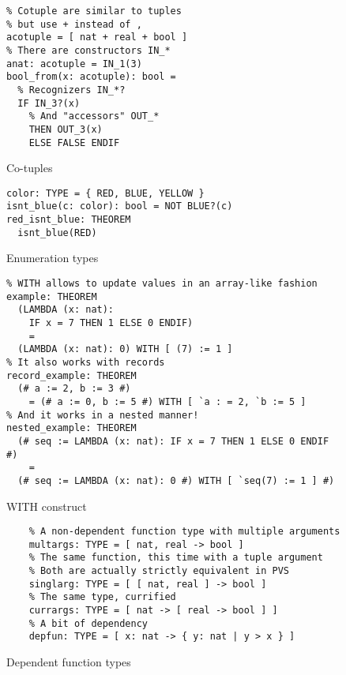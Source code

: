 \documentclass[utf8,a4paper]{article}
\begin{document}
\begin{figure}
  \centering
  \begin{verbatim}
% Cotuple are similar to tuples
% but use + instead of ,
acotuple = [ nat + real + bool ]
% There are constructors IN_*
anat: acotuple = IN_1(3)
bool_from(x: acotuple): bool =
  % Recognizers IN_*?
  IF IN_3?(x)
    % And "accessors" OUT_*
    THEN OUT_3(x)
    ELSE FALSE ENDIF
  \end{verbatim}
  \caption{Co-tuples}
  \label{fig:cotuple}
\end{figure}

\begin{figure}
  \centering
  \begin{verbatim}
color: TYPE = { RED, BLUE, YELLOW }
isnt_blue(c: color): bool = NOT BLUE?(c)
red_isnt_blue: THEOREM
  isnt_blue(RED)
  \end{verbatim}
  \caption{Enumeration types}
  \label{fig:enum}
\end{figure}

\begin{figure}
  \centering
  \begin{verbatim}
% WITH allows to update values in an array-like fashion
example: THEOREM
  (LAMBDA (x: nat):
    IF x = 7 THEN 1 ELSE 0 ENDIF)
    =
  (LAMBDA (x: nat): 0) WITH [ (7) := 1 ]
% It also works with records
record_example: THEOREM
  (# a := 2, b := 3 #)
    = (# a := 0, b := 5 #) WITH [ `a : = 2, `b := 5 ]
% And it works in a nested manner!
nested_example: THEOREM
  (# seq := LAMBDA (x: nat): IF x = 7 THEN 1 ELSE 0 ENDIF #)
    =
  (# seq := LAMBDA (x: nat): 0 #) WITH [ `seq(7) := 1 ] #)
  \end{verbatim}
  \caption{WITH construct}
  \label{fig:with}
\end{figure}

\begin{figure}
  \centering
  \begin{verbatim}
    % A non-dependent function type with multiple arguments
    multargs: TYPE = [ nat, real -> bool ]
    % The same function, this time with a tuple argument
    % Both are actually strictly equivalent in PVS
    singlarg: TYPE = [ [ nat, real ] -> bool ]
    % The same type, currified
    currargs: TYPE = [ nat -> [ real -> bool ] ]
    % A bit of dependency
    depfun: TYPE = [ x: nat -> { y: nat | y > x } ]
  \end{verbatim}
  \caption{Dependent function types}
  \label{fig:funtypes}
\end{figure}
\end{document}

